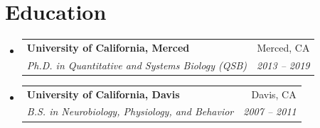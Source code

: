 \documentclass[letterpaper,11pt]{article}
\makeatletter
\newcommand{\resumeSubheading}[4]{
  \vspace{-2pt}\item
    \begin{tabular*}{0.97\textwidth}[t]{l@{\extracolsep{\fill}}r}
      \textbf{#1} & #2 \\
      \textit{\small#3} & \textit{\small #4} \\
    \end{tabular*}\vspace{-7pt}
}
\newcommand{\resumeSubHeadingListStart}{\begin{itemize}[leftmargin=0.15in, label={}]}
\newcommand{\resumeSubHeadingListEnd}{\end{itemize}}
\makeatother
\begin{document}
\section{Education}
  \resumeSubHeadingListStart
    \resumeSubheading
      {University of California, Merced}{Merced, CA}
      {Ph.D. in Quantitative and Systems Biology (QSB)}{2013 -- 2019}
    \resumeSubheading
      {University of California, Davis}{Davis, CA}
      {B.S. in Neurobiology, Physiology, and Behavior}{2007 -- 2011}
  \resumeSubHeadingListEnd

\end{document}
